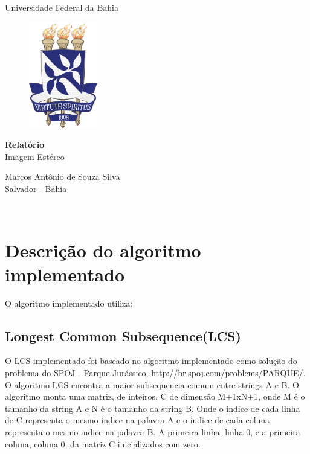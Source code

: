 \documentclass[a4paper, 12pt]{article}
\begin{document}
	\begin{titlepage}

		\begin{center}

			\huge{Universidade Federal da Bahia}

			\vspace{100pt}

			\begin{figure}[!ht]
				\centering
				\includegraphics[width=3cm]{UFBA.png}
			\end{figure}
			        
			\vspace{75pt}

			\textbf{\LARGE{Relatório}}\\
			\large{Imagem Estéreo}

			\vspace{160pt}

			Marcos Antônio de Souza Silva\\
			Salvador - Bahia \date{today} \\

		\end{center}

	\end{titlepage}

	\newpage

	
	\section{Descrição do algoritmo implementado}

	O algoritmo implementado utiliza:

	\subsection{Longest Common Subsequence(LCS)}
	
	O LCS implementado foi baseado no algoritmo implementado como solução do problema do SPOJ - Parque Jurássico, http://br.spoj.com/problems/PARQUE/. 
	O algoritmo LCS encontra a maior subsequencia comum entre strings A e B. O algoritmo monta uma matriz, de inteiros, C de dimensão M+1xN+1, onde M é o tamanho da string A e N é o tamanho da string B. Onde o indice de cada linha de C representa o mesmo indice na palavra A e o indice de cada coluna representa o mesmo indice na palavra B. A primeira linha, linha 0, e a primeira coluna, coluna 0, da matriz C inicializados com zero. \\
\end{document}
